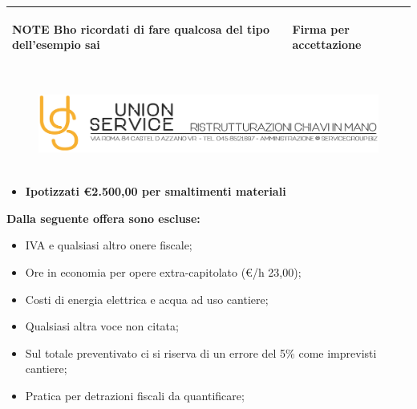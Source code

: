 \documentclass[a4paper]{article}
\begin{document}
                       
                      \vspace{19mm}


                      \begin{center}
                      \begin{tabular}{|L{105mm} | L{44mm}| }
                      \hline
                      \begin{spacing}{0.3}
                        \textbf{NOTE} \newline
                        \hfill
                        Bho ricordati di fare qualcosa del tipo dell'esempio sai
                    
                      \end{spacing}&
                      \begin{spacing}{0.3}
                      \textbf{Firma per accettazione}
                      \end{spacing}\\
                      \hline
                      \end{tabular}
                      \end{center}
                    
                      \newpage
                    
                      \begin{figure}[!t]
                      \includegraphics[width=15.8cm, height=3cm]{intestazioneAlta2.jpg}
                      \end{figure}
                    
                      \begin{itemize}
                          \item \textbf{Ipotizzati \euro 2.500,00 per smaltimenti materiali}
                      \end{itemize}
                    
                      \noindent\textbf{Dalla seguente offera sono escluse:}
                      \begin{itemize}
                          \item IVA e qualsiasi altro onere fiscale;
                          \item Ore in economia per opere extra-capitolato (\euro/h 23,00);
                          \item Costi di energia elettrica e acqua ad uso cantiere;
                          \item Qualsiasi altra voce non citata;
                          \item Sul totale preventivato ci si riserva di un errore del 5\% come imprevisti cantiere;
                          \item Pratica per detrazioni fiscali da quantificare;
                      \end{itemize}
                    
\end{document}
